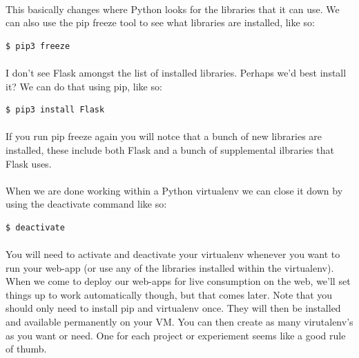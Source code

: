 \documentclass[12pt, a4paper, oneside]{book}
\begin{document}
\paragraph{} This basically changes where Python looks for the libraries that it can use. We can also use the pip freeze tool to see what libraries are installed, like so:

\begin{lstlisting}[style=DOS]
    $ pip3 freeze
\end{lstlisting}

\paragraph{} I don't see Flask amongst the list of installed libraries. Perhaps we'd best install it? We can do that using pip, like so:

\begin{lstlisting}[style=DOS]
    $ pip3 install Flask
\end{lstlisting}

\paragraph{} If you run pip freeze again you will notce that a bunch of new libraries are installed, these include both Flask and a bunch of supplemental ilbraries that Flask uses.

\paragraph{} When we are done working within a Python virtualenv we can close it down by using the deactivate command like so:
\begin{lstlisting}[style=DOS]
    $ deactivate
\end{lstlisting}

\paragraph{} You will need to activate and deactivate your virtualenv whenever you want to run your web-app (or use any of the libraries installed within the virtualenv). When we come to deploy our web-apps for live consumption on the web, we'll set things up to work automatically though, but that comes later. Note that you should only need to install pip and virtualenv once. They will then be installed and available permanently on your VM. You can then create as many virutalenv's as you want or need. One for each project or experiement seems like a good rule of thumb.
\end{document}
